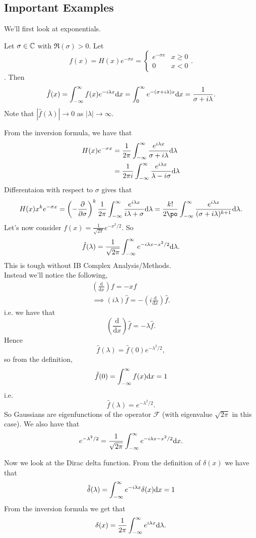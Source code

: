 \documentclass{article}
\begin{document}
\subsection{Important Examples}
We'll first look at exponentials.\par
Let $ \sigma\in \mathbb{C} $ with $ \Re(\sigma)>0 $. Let \[
	f(x)=H(x)e^{-\sigma x} = \begin{cases}
		e^{-\sigma x} & x \ge 0\\
		0 & x < 0
	\end{cases}.
\].
Then
\[
	\hat f(x)=\int_{-\infty}^\infty f(x)e^{-i\lambda x}\mathrm dx=\int_0^\infty e^{-(\sigma +i\lambda)x}\mathrm dx=\frac 1{\sigma+i\lambda}.
\]
Note that $ |\hat f(\lambda)|\to 0 $ as $ |\lambda|\to \infty $.\par
From the inversion formula, we have that
\begin{align*}
	H(x)e^{-\sigma x}&=\frac {1}{2\pi}\int_{-\infty}^\infty \frac{e^{i\lambda x}}{\sigma +i\lambda}\mathrm{d}\lambda\\
			 &=\frac {1}{2\pi i}\int_{-\infty}^\infty \frac{e^{i\lambda x}}{\lambda-i\sigma}\mathrm{d}\lambda
\end{align*}
Differentaion with respect to $ \sigma $ gives that
\[
	H(x)x^ke^{-\sigma x}=\left(-\frac{\partial}{\partial \sigma}\right)^k\frac {1}{2\pi}\allint \frac{e^{i\lambda x}}{i\lambda +\sigma} \mathrm{d}\lambda=\frac{k!}{2\po}\allint \frac{e^{i\lambda x}}{(\sigma+i\lambda)^{k+1}}\mathrm {d}\lambda.
\]
Let's now consider $ f(x)=\frac 1{\sqrt{2\pi}}e^{-x^2/2} $. So
\begin{align*}
	\hat {f}(\lambda)=\frac {1}{\sqrt{2\pi}}\int_{-\infty}^\infty e^{-i\lambda x-x^2/2}\mathrm {d}\lambda.
\end{align*}
This is tough without IB Complex Analysis/Methods.\\
Instead we'll notice the following,
\begin{align*}
	\left(\frac{\mathrm d}{\mathrm dx}\right) f=-xf\\
	\implies (i\lambda)\hat f=-\left(i\frac{\mathrm d}{\mathrm dx}\right)\hat f.
\end{align*}
i.e. we have that
\[
	\left(\frac{\mathrm d}{\mathrm dx}\right)\hat f=-\lambda \hat f.
\]
Hence
\[
	\hat f(\lambda)=\hat f(0)e^{-\lambda^2/2},
\]
so from the definition,
\[
  \hat f(0)=\int_{-\infty}^\infty f(x)\mathrm dx=1
\]
i.e.
\[
	\hat f(\lambda)=e^{-\lambda^2/2}.
\]
So Gaussians are eigenfunctions of the operator $ \mathcal F $ (with eigenvalue $ \sqrt{2\pi} $ in this case). We also have that
\[
	e^{-\lambda^2/2}=\frac 1{\sqrt{2\pi}}\int_{-\infty}^\infty e^{-i\lambda x-x^2/2}\mathrm dx.
\]
\par
Now we look at the Dirac delta function. From the definition of $ \delta(x) $ we have that
\begin{align*}
	\hat \delta(\lambda)=\int_{-\infty}^\infty e^{-i\lambda x}\delta(x)\mathrm dx=1
\end{align*}
From the inversion formula we get that
\[
	\delta(x)=\frac 1{2\pi}\int_{-\infty}^\infty e^{i\lambda x}\mathrm d\lambda.
\]
\end{document}
